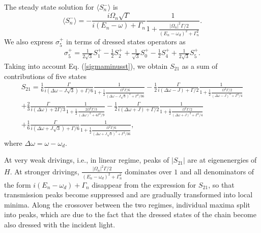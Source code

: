 \documentclass[%
 aps, pra,
 amsmath,amssymb,
 preprint,%
superscriptaddress
]{revtex4-2}
\begin{document}
The steady state solution for $\langle S_n^{-} \rangle$ is
\begin{equation}
\langle S_n^{-} \rangle  = -
\frac{i \Omega_{n} \sqrt{\Gamma}}{i\left(E_n - \omega\right) + \Gamma_n}
\frac{1}{1+ \frac{|\Omega_{n}|^2 \Gamma/2}{\left(E_n - \omega_d\right)^2 +
		\Gamma_n^2}}. \label{sigmaminusst}
\end{equation}
We also express $\sigma_{5}^{+} $ in terms of dressed states operators as \begin{eqnarray}
\sigma_5^{+}=\frac{1}{2\sqrt{3}}S_1^{+} - \frac{1}{2}S_2^{+} + \frac{1}{\sqrt{3}}S_0^{+} - \frac{1}{2}S_4^{+} + \frac{1}{2\sqrt{3}}S_5^{+}.
\label{sigma5}
\end{eqnarray}
Taking into account Eq. (\ref{sigmaminusst}), we obtain $S_{21}$ as a sum of contributions of five states
\begin{eqnarray}
S_{21} = \frac{1}{6} \frac{\Gamma}{i\left(\Delta
	\omega - J \sqrt{3}\right) + \Gamma/6}
\frac{1}{1+ \frac{1}{2}\frac{ \Omega^2 \Gamma /6}{\left(\Delta
		\omega - J \sqrt{3}\right)^2 + \Gamma^2/36}}  \nonumber
-\frac{1}{2} \frac{\Gamma}{i\left(\Delta
	\omega - J \right) + \Gamma/2}
\frac{1}{1+ \frac{1}{2} \frac{ \Omega^2 \Gamma /2}{\left(\Delta
		\omega - J \right)^2 + \Gamma^2/4}} \\ \nonumber
+ \frac{2}{3} \frac{\Gamma}{i\left(\Delta
	\omega \right) + 2\Gamma/3}
\frac{1}{1+ \frac{1}{2}\frac{ 2 \Omega^2 \Gamma /3}{\left(\Delta
		\omega \right)^2 + 4 \Gamma^2/9}} %
-\frac{1}{2} \frac{\Gamma}{i\left(\Delta
	\omega + J \right) + \Gamma/2}
\frac{1}{1+ \frac{1}{2}\frac{ \Omega^2 \Gamma /2}{\left(\Delta
		\omega + J \right)^2 + \Gamma^2/4}} \\ %
+ \frac{1}{6} \frac{\Gamma}{i\left(\Delta
	\omega + J \sqrt{3}\right) + \Gamma/6}
\frac{1}{1+ \frac{1}{2}\frac{ \Omega^2 \Gamma /6}{\left(\Delta
		\omega + J \sqrt{3}\right)^2 + \Gamma^2/36}},
\label{bout}
\end{eqnarray}
where $\Delta \omega = \omega - \omega_d$.


At very weak drivings, i.e., in linear regime, peaks of $|S_{21}|$ are at eigenenergies of $H$. At stronger drivings,
$ \frac{|\Omega_{n}|^2 \Gamma / 2}{\left(E_n - \omega_d\right)^2 +
	\Gamma_n^2}$ dominates over $1$ and
all denominators of the form $i\left(E_n - \omega_d\right) + \Gamma_n$
disappear from the expression for $S_{21}$, so that
transmission peaks become suppressed and are gradually transformed into local minima. Along the crossover between the two regimes,
individual maxima split into peaks, which are due to the fact that the dressed states of the chain become also dressed with the incident light.
\end{document}

